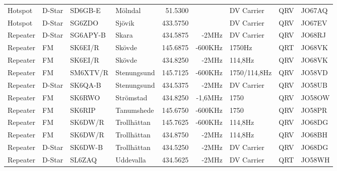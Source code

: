 \begin{landscape}
\begin{longtable}{llllrrlcl}
	Hotspot           & D-Star       & SD6GB-E       & Mölndal             &           51.5300 &                & DV Carrier      &       QRV       & JO67AQ           \\
	Hotspot           & D-Star       & SG6ZDO        & Sjövik              &          433.5750 &                & DV Carrier      &       QRV       & JO67EV           \\
	Repeater          & D-Star       & SG6APY-B      & Skara               &          434.5875 &          -2MHz & DV Carrier      &       QRV       & JO68RJ           \\
	Repeater          & FM           & SK6EI/R       & Skövde              &          145.6875 &        -600KHz & 1750Hz          &       QRT       & JO68VK           \\
	Repeater          & FM           & SK6EI/R       & Skövde              &          434.8250 &          -2MHz & 114,8Hz         &       QRV       & JO68VK           \\
	Repeater          & FM           & SM6XTV/R      & Stenungsund         &          145.7125 &        -600KHz & 1750/114,8Hz    &       QRV       & JO58VD           \\
	Repeater          & D-Star       & SK6QA-B       & Stenungsund         &          434.5375 &          -2MHz & DV Carrier      &       QRV       & JO58UB           \\
	Repeater          & FM           & SK6RWO        & Strömstad           &          434.8250 &        -1,6MHz & 1750            &       QRV       & JO58OW           \\
	Repeater          & FM           & SK6RIP        & Tanumshede          &          145.6750 &        -600KHz & 1750            &       QRV       & JO58PR           \\
	Repeater          & FM           & SK6DW/R       & Trollhättan         &          145.7625 &        -600KHz & 114,8Hz         &       QRV       & JO68DG           \\
	Repeater          & FM           & SK6DW/R       & Trollhättan         &          434.8750 &          -2MHz & 114,8Hz         &       QRV       & JO68BH           \\
	Repeater          & D-Star       & SK6DW-B       & Trollhättan         &          434.5250 &          -2MHz & DV Carrier      &       QRV       & JO68DG           \\
	Repeater          & D-Star       & SL6ZAQ        & Uddevalla           &          434.5625 &          -2MHz & DV Carrier      &       QRT       & JO58WH           \\

\end{longtable}
\end{landscape}
